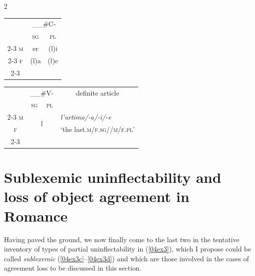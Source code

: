 \documentclass[output=paper,colorlinks,citecolor=brown]{langscibook}
\begin{document}
\bigskip

\noindent \begin{minipage}{0.65\textwidth}
	\begin{multicols}{2}
		
		\begin{exe}
			\ex \label{04ex10}
			\begin{xlist}
				\ex \label{04ex10a}
				\begin{tabularx}{\textwidth}{ccc}
					& \multicolumn{2}{c}{\_\_\#C-} \\
					& \textsc{sg} & \textsc{pl} \\
					\cline{2-3}
					\textsc{m} & \multicolumn{1}{|c|}{er} & \multicolumn{1}{c|}{(l)i} \\
					\cline{2-3}
					\textsc{f} & \multicolumn{1}{|c|}{(l)a} & \multicolumn{1}{c|}{(l)e} \\
					\cline{2-3}
				\end{tabularx}
				
				\ex \label{04ex10b}
				\begin{tabularx}{\textwidth}{cccc}
					& \multicolumn{2}{c}{\_\_\#V-} & \ili{Romanesco} definite article \\
					& \textsc{sg} & \textsc{pl} & \\
					\cline{2-3}
					\textsc{m} & \multicolumn{2}{|c|}{\multirow{2}{*}{l}} & \multicolumn{1}{l}{\emph{l’urtimo/-a/-i/-e}} \\
					\textsc{f} & \multicolumn{1}{|c}{} & \multicolumn{1}{c|}{} & \multicolumn{1}{l}{‘the last\textsc{.m/f.sg//m/f.pl}’} \\
					\cline{2-3}
				\end{tabularx}
			\end{xlist}
		\end{exe}
		
	\end{multicols}
\end{minipage}

\bigskip

\section{Sublexemic uninflectability and loss of object agreement in Romance} \label{04sec4}

Having paved the ground, we now finally come to the last two in the
tentative inventory of types of partial uninflectability in (\ref{04ex3}), which I propose could be called \textit{sublexemic} (\ref{04ex3c}--\ref{04ex3d}) and which are those involved in the cases of agreement loss to be discussed in this section.
\end{document}
